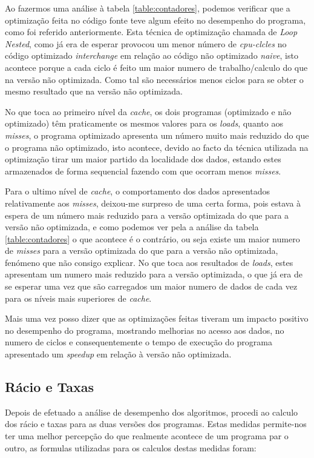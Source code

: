 \documentclass[conference,compsoc]{IEEEtran}
\begin{document}
Ao fazermos uma análise à tabela \ref{table:contadores}, podemos verificar que a optimização feita no código fonte teve algum efeito no desempenho do programa, como foi referido anteriormente. Esta técnica de optimização chamada de \textit{Loop Nested}, como já era de esperar provocou um menor número de \textit{cpu-clcles} no código optimizado \textit{interchange} em relação ao código não optimizado \textit{naive}, isto acontece porque a cada ciclo é feito um maior numero de trabalho/calculo do que na versão não optimizada. Como tal são necessários menos ciclos para se obter o mesmo resultado que na versão não optimizada.

No que toca ao primeiro nível da \textit{cache}, os dois programas (optimizado e não optimizado) têm praticamente os mesmos valores para os \textit{loads}, quanto aos \textit{misses}, o programa optimizado apresenta um número muito mais reduzido do que o programa não optimizado, isto acontece, devido ao facto da técnica utilizada na optimização tirar um maior partido da localidade dos dados, estando estes armazenados de forma sequencial fazendo com que ocorram menos \textit{misses}. 

Para o ultimo nível de \textit{cache}, o comportamento dos dados apresentados relativamente aos \textit{misses}, deixou-me surpreso de uma certa forma, pois estava à espera de um número mais reduzido para a versão optimizada do que para a versão não optimizada, e como podemos ver pela a análise da tabela \ref{table:contadores} o que acontece é o contrário, ou seja existe um maior numero de \textit{misses} para a versão optimizada do que para a versão não optimizada, fenómeno que não consigo explicar. No que toca aos resultados de \textit{loads}, estes apresentam um numero mais reduzido para a versão optimizada, o que já era de se esperar uma vez que são carregados um maior numero de dados de cada vez para os níveis mais superiores de \textit{cache}.

Mais uma vez posso dizer que as optimizações feitas tiveram um impacto positivo no desempenho do programa, mostrando melhorias no acesso aos dados, no numero de ciclos e consequentemente o tempo de execução do programa apresentado um \textit{speedup} em relação à versão não optimizada.

\subsection{Rácio e Taxas}

Depois de efetuado a análise de desempenho dos algoritmos, procedi ao calculo dos rácio e taxas para as duas versões dos programas. Estas medidas permite-nos ter uma melhor percepção do que realmente acontece de um programa par o outro, as formulas utilizadas para os calculos destas medidas foram:
\end{document}
